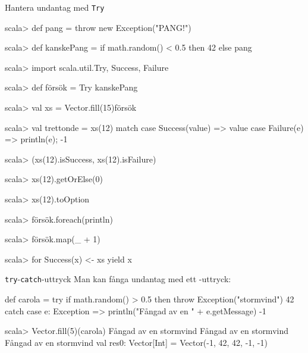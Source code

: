 \begin{Slide}{Hantera undantag med \texttt{Try}}
\vspace{-0.5em}\begin{REPLsmall}
scala> def pang = throw new Exception("PANG!")

scala> def kanskePang = if math.random() < 0.5 then 42 else pang

scala> import scala.util.{Try, Success, Failure}

scala> def försök = Try { kanskePang }

scala> val xs = Vector.fill(15){försök}

scala> val trettonde = xs(12) match
         case Success(value) => value
         case Failure(e) => println(e); -1

scala> (xs(12).isSuccess, xs(12).isFailure) 

scala> xs(12).getOrElse(0)

scala> xs(12).toOption

scala> försök.foreach(println)

scala> försök.map(_ + 1)

scala> for Success(x) <- xs yield x
\end{REPLsmall}
\end{Slide}



\begin{Slide}{\texttt{try}-\texttt{catch}-uttryck}\SlideFontSmall
Man kan fånga undantag med ett -uttryck:
\begin{Code}
def carola = 
  try 
    if math.random() > 0.5 then throw Exception("stormvind")
    42
  catch 
    case e: Exception =>
      println("Fångad av en " + e.getMessage)
      -1

\end{Code}
\pause
\begin{REPL}
scala> Vector.fill(5)(carola)
Fångad av en stormvind
Fångad av en stormvind
Fångad av en stormvind
val res0: Vector[Int] = Vector(-1, 42, 42, -1, -1)
\end{REPL}
\end{Slide}


